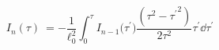 \begin{equation}\label{rw5}
I_{n}(\tau)\ = -\dfrac{1}{\ell_{0}^{2}} \int_{0}^{\tau}
I_{n-1}\bigl({{\tau^{\prime}}}\bigr)\dfrac{(\tau
^{2}-{\tau^{\prime}}^{2})}{2 \tau^{2}}\tau^{\prime}\dd {\tau^{\prime}}
\end{equation}

